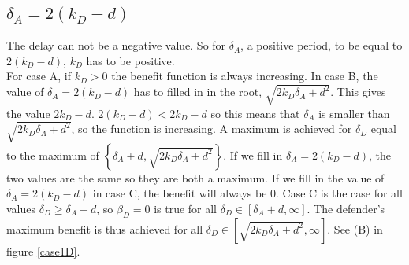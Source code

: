

\subsection*{$\delta_{A} = 2(k_{D} - d)$}
The delay can not be a negative value. So for $\delta_{A}$, a positive period, to be equal to  $2(k_{D} - d)$, $k_{D}$ has to be positive. \\
For case A, if $k_{D}>0$ the benefit function is always increasing. In case B, the value of $\delta_{A} =2(k_{D} - d)$ has to filled in in the root, $\sqrt{2k_{D}\delta_{A} + d^{2}}$. This gives the value $2k_{D}-d$. $2(k_{D}-d) < 2k_{D}-d$ so this means that $\delta_{A}$ is smaller than $ \sqrt{2k_{D}\delta_{A} + d^{2}}$, so the function is increasing. A maximum is achieved for $\delta_{D}$ equal to the maximum of $\left\lbrace \delta_{A}+d, \sqrt{2k_{D}\delta_{A} + d^{2}}\right\rbrace $. If we fill in $\delta_{A} = 2(k_{D} - d)$, the two values are the same so they are both a maximum.
If we fill in the value of $\delta_{A} = 2(k_{D} - d)$ in case C, the benefit will always be 0. Case C is the case for all values $\delta_{D} \geq \delta_{A} + d$, so $\beta_{D}=0$ is true for all $\delta_{D} \in [\delta_{A}+d, \infty]$.
The defender's maximum benefit is thus achieved for all $\delta_{D} \in [\sqrt{2k_{D}\delta_{A} + d^{2}}, \infty]$. See (B) in figure \ref{case1D}.


